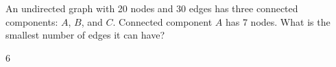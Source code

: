 \begin{prob}
    An undirected graph with 20 nodes and 30 edges has three connected components:
    $A$, $B$, and $C$. Connected component $A$ has 7 nodes. What is the smallest
    number of edges it can have?

    \begin{soln}
        6
    \end{soln}

\end{prob}
